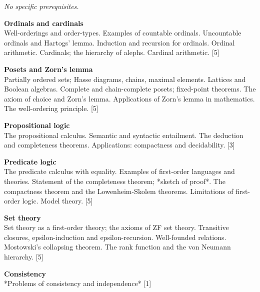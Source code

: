 \documentclass[a4paper]{article}
\begin{document}
\maketitle
{\small
\noindent\emph{No specific prerequisites.}
\vspace{10pt}

\noindent\textbf{Ordinals and cardinals}\\
Well-orderings and order-types. Examples of countable ordinals. Uncountable ordinals and Hartogs' lemma. Induction and recursion for ordinals. Ordinal arithmetic. Cardinals; the hierarchy of alephs. Cardinal arithmetic.\hspace*{\fill} [5]

\vspace{10pt}
\noindent\textbf{Posets and Zorn's lemma}\\
Partially ordered sets; Hasse diagrams, chains, maximal elements. Lattices and Boolean algebras. Complete and chain-complete posets; fixed-point theorems. The axiom of choice and Zorn's lemma. Applications of Zorn's lemma in mathematics. The well-ordering principle.\hspace*{\fill} [5]

\vspace{10pt}
\noindent\textbf{Propositional logic}\\
The propositional calculus. Semantic and syntactic entailment. The deduction and completeness theorems. Applications: compactness and decidability.\hspace*{\fill} [3]

\vspace{10pt}
\noindent\textbf{Predicate logic}\\
The predicate calculus with equality. Examples of first-order languages and theories. Statement of the completeness theorem; *sketch of proof*. The compactness theorem and the Lowenheim-Skolem theorems. Limitations of first-order logic. Model theory.\hspace*{\fill} [5]

\vspace{10pt}
\noindent\textbf{Set theory}\\ Set theory as a first-order theory; the axioms of ZF set theory. Transitive closures, epsilon-induction and epsilon-recursion. Well-founded relations. Mostowski's collapsing theorem. The rank function and the von Neumann hierarchy.\hspace*{\fill} [5]

\vspace{10pt}
\noindent\textbf{Consistency}\\
*Problems of consistency and independence*\hspace*{\fill} [1]}
\end{document}
